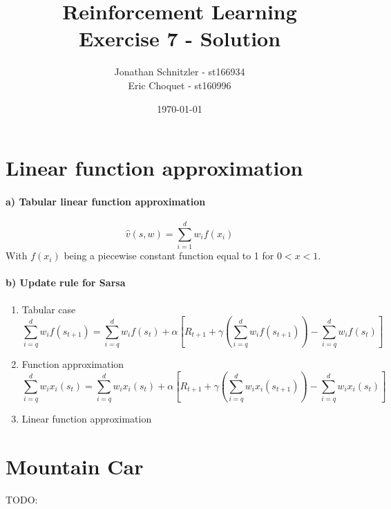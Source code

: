 \documentclass{article}
\title{Reinforcement Learning \\ Exercise 7 - Solution}
\author{Jonathan Schnitzler - st166934 \\
Eric Choquet - st160996}
\date{\today}
\begin{document}
\maketitle

\section{Linear function approximation}

\paragraph*{a)  Tabular linear function approximation}

$$\hat{v}(s,w) = \sum_{i=1}^d w_i f(x_i)$$
With $f(x_i)$ being a piecewise constant function equal to 1 for $0<x<1$.

\paragraph*{b) Update rule for Sarsa}

\begin{enumerate}
\item Tabular case\\
$$\sum_{i=q}^d w_i f(s_{t+1}) = \sum_{i=q}^d w_i f(s_t) +\alpha [R_{t+1} + \gamma (\sum_{i=q}^d w_i f(s_{t+1})) - \sum_{i=q}^d w_i f(s_t)]$$
\item Function approximation\\
$$\sum_{i=q}^d w_i x_i(s_t) = \sum_{i=q}^d w_i x_i(s_t) +\alpha [R_{t+1} + \gamma (\sum_{i=q}^d w_i x_i(s_{t+1})) - \sum_{i=q}^d w_i x_i(s_t)]$$
\item Linear function approximation\\

\end{enumerate}



\section{Mountain Car}

\begin{comment}
\begin{figure}[H]
\centering
\texttt{[image: images/terminal.png]}
\caption{Output for Trees with \texttt{maxiter} = [10, 20, 50, 100, 200, 500]}
\label{fig:terminal}
\end{figure}
\end{comment}
TODO:
\end{document}
